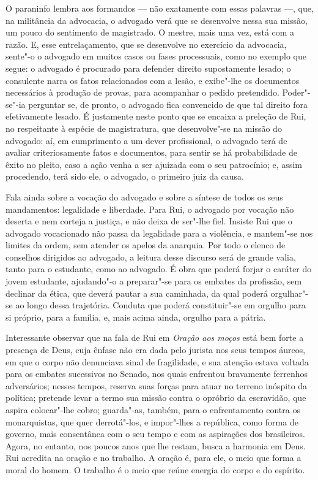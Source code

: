O paraninfo lembra aos formandos --- não exatamente com essas palavras ---,
que, na militância da advocacia, o advogado verá que se desenvolve
nessa sua missão, um pouco do sentimento de magistrado. O mestre, mais
uma vez, está com a razão. E, esse entrelaçamento, que se desenvolve no
exercício da advocacia, sente"-o o advogado em muitos casos ou fases
processuais, como no exemplo que segue: o advogado é procurado para
defender direito supostamente lesado; o consulente narra os fatos
relacionados com a lesão, e exibe"-lhe os documentos necessários à
produção de provas, para acompanhar o pedido pretendido. Poder"-se"-ia
perguntar se, de pronto, o advogado fica convencido de que tal direito
fora efetivamente lesado. É justamente neste ponto que se encaixa a
preleção de Rui, no respeitante à espécie de magistratura, que 
desenvolve"-se na missão do advogado: aí, em cumprimento a um dever
profissional, o advogado terá de avaliar criteriosamente fatos e
documentos, para sentir se há probabilidade de êxito no pleito, caso a
ação venha a ser ajuizada com o seu patrocínio; e, assim procedendo,
terá sido ele, o advogado, o primeiro juiz da causa. 

Fala ainda sobre a vocação do advogado
e sobre a síntese de todos os seus mandamentos: legalidade e liberdade.
Para Rui, o advogado por vocação não deserta e nem corteja a justiça, e
não deixa de ser"-lhe fiel. Insiste Rui que o advogado vocacionado não
passa da legalidade para a violência, e mantem"-se nos limites da ordem,
sem atender os apelos da anarquia. Por todo o elenco de conselhos
dirigidos ao advogado, a leitura desse discurso será de
grande valia, tanto para o estudante, como ao advogado. 
É obra que poderá forjar o caráter do jovem
estudante, ajudando"-o a preparar"-se para os embates da profissão, sem
declinar da ética, que deverá pautar a sua caminhada, da qual poderá
orgulhar"-se ao longo dessa trajetória. Conduta que poderá constituir"-se
em orgulho para si próprio, para a família, e, mais acima ainda,
orgulho para a pátria.

Interessante observar que na fala de Rui em \textit{Oração aos moços} está
bem forte a presença de Deus, cuja ênfase não era dada pelo jurista nos
seus tempos áureos, em que o corpo não denunciava sinal de fragilidade,
e sua atenção estava voltada para os embates sucessivos no Senado, nos
quais enfrentou bravamente ferrenhos adversários; nesses tempos, reserva
suas forças para atuar no terreno inóspito da política; pretende levar
a termo sua missão contra o opróbrio da escravidão, que aspira
colocar"-lhe cobro; guarda"-as, também, para o enfrentamento contra os
monarquistas, que quer derrotá"-los, e impor"-lhes a república, como
forma de governo, mais consentânea com o seu tempo e com as aspirações
dos brasileiros. Agora, no entanto, nos poucos anos que lhe restam,
busca a harmonia em Deus. Rui acredita na oração e no trabalho. A
oração é, para ele, o meio que forma a moral do homem. O trabalho é o
meio que reúne energia do corpo e do espírito.

